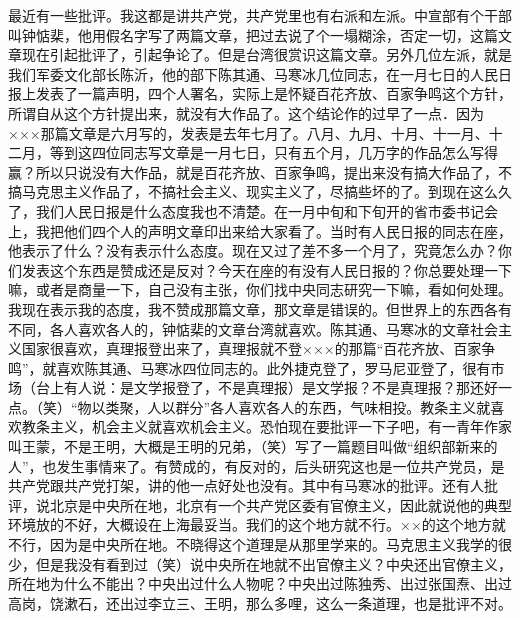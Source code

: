 最近有一些批评。我这都是讲共产党，共产党里也有右派和左派。中宣部有个干部叫钟惦棐，他用假名字写了两篇文章，把过去说了个一塌糊涂，否定一切，这篇文章现在引起批评了，引起争论了。但是台湾很赏识这篇文章。另外几位左派，就是我们军委文化部长陈沂，他的部下陈其通、马寒冰几位同志，在一月七日的人民日报上发表了一篇声明，四个人署名，实际上是怀疑百花齐放、百家争鸣这个方针，所谓自从这个方针提出来，就没有大作品了。这个结论作的过早了一点．因为×××那篇文章是六月写的，发表是去年七月了。八月、九月、十月、十一月、十二月，等到这四位同志写文章是一月七日，只有五个月，几万字的作品怎么写得赢？所以只说没有大作品，就是百花齐放、百家争鸣，提出来没有搞大作品了，不搞马克思主义作品了，不搞社会主义、现实主义了，尽搞些坏的了。到现在这么久了，我们人民日报是什么态度我也不清楚。在一月中旬和下旬开的省市委书记会上，我把他们四个人的声明文章印出来给大家看了。当时有人民日报的同志在座，他表示了什么？没有表示什么态度。现在又过了差不多一个月了，究竟怎么办？你们发表这个东西是赞成还是反对？今天在座的有没有人民日报的？你总要处理一下嘛，或者是商量一下，自己没有主张，你们找中央同志研究一下嘛，看如何处理。我现在表示我的态度，我不赞成那篇文章，那文章是错误的。但世界上的东西各有不同，各人喜欢各人的，钟惦棐的文章台湾就喜欢。陈其通、马寒冰的文章社会主义国家很喜欢，真理报登出来了，真理报就不登×××的那篇“百花齐放、百家争鸣”，就喜欢陈其通、马寒冰四位同志的。此外捷克登了，罗马尼亚登了，很有市场（台上有人说：是文学报登了，不是真理报）是文学报？不是真理报？那还好一点。（笑）“物以类聚，人以群分”各人喜欢各人的东西，气味相投。教条主义就喜欢教条主义，机会主义就喜欢机会主义。恐怕现在要批评一下子吧，有一青年作家叫王蒙，不是王明，大概是王明的兄弟，（笑）写了一篇题目叫做“组织部新来的人”，也发生事情来了。有赞成的，有反对的，后头研究这也是一位共产党员，是共产党跟共产党打架，讲的他一点好处也没有。其中有马寒冰的批评。还有人批评，说北京是中央所在地，北京有一个共产党区委有官僚主义，因此就说他的典型环境放的不好，大概设在上海最妥当。我们的这个地方就不行。××的这个地方就不行，因为是中央所在地。不晓得这个道理是从那里学来的。马克思主义我学的很少，但是我没有看到过（笑）说中央所在地就不出官僚主义？中央还出官僚主义，所在地为什么不能出？中央出过什么人物呢？中央出过陈独秀、出过张国焘、出过高岗，饶漱石，还出过李立三、王明，那么多哩，这么一条道理，也是批评不对。

